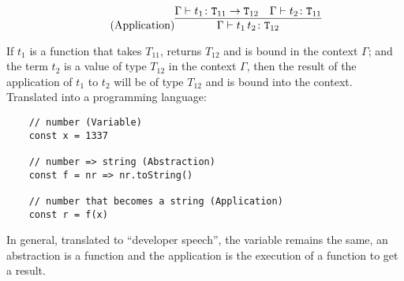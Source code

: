 \begin{equation*}
    \tag{Application}
    \infer{
        \Gamma \vdash t_1\,t_2 \colon \texttt{T}_{12}
    }{
        \Gamma \vdash t_1 \colon \texttt{T}_{11} \rightarrow \texttt{T}_{12}
        &
        \Gamma \vdash t_2 \colon \texttt{T}_{11}
    }
\end{equation*}

If $t_1$ is a function that takes $T_{11}$, returns
$T_{12}$ and is bound in the context $\Gamma$;
and the term $t_2$ is a value of type $T_{12}$ in the context $\Gamma$, then
the result of the application of $t_1$ to $t_2$ will
be of type $T_{12}$ and is bound into the context.
\\[12pt]
Translated into a programming language:

\begin{verbatim}
    // number (Variable)
    const x = 1337

    // number => string (Abstraction)
    const f = nr => nr.toString()

    // number that becomes a string (Application)
    const r = f(x)
\end{verbatim}

In general, translated to ``developer speech'', the variable
remains the same, an abstraction is a function and the application
is the execution of a function to get a result.
